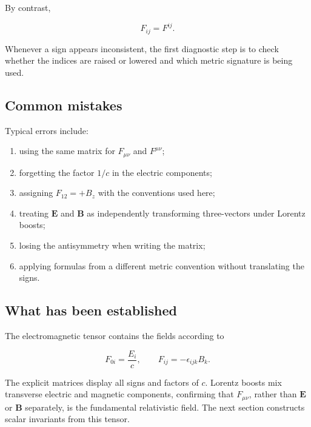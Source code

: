 By contrast,

\[
F_{ij}=F^{ij}.
\]

Whenever a sign appears inconsistent, the first diagnostic step is to check whether the indices are raised or lowered and which metric signature is being used.

\subsection{Common mistakes}

Typical errors include:

\begin{enumerate}
    \item using the same matrix for \(F_{\mu\nu}\) and \(F^{\mu\nu}\);
    \item forgetting the factor \(1/c\) in the electric components;
    \item assigning \(F_{12}=+B_z\) with the conventions used here;
    \item treating \(\mathbf{E}\) and \(\mathbf{B}\) as independently transforming three-vectors under Lorentz boosts;
    \item losing the antisymmetry when writing the matrix;
    \item applying formulas from a different metric convention without translating the signs.
\end{enumerate}

\subsection{What has been established}

The electromagnetic tensor contains the fields according to

\[
F_{0i}
=
\frac{E_i}{c},
\qquad
F_{ij}
=
-\epsilon_{ijk}B_k.
\]

The explicit matrices display all signs and factors of \(c\). Lorentz boosts mix transverse electric and magnetic components, confirming that \(F_{\mu\nu}\), rather than \(\mathbf{E}\) or \(\mathbf{B}\) separately, is the fundamental relativistic field. The next section constructs scalar invariants from this tensor.
